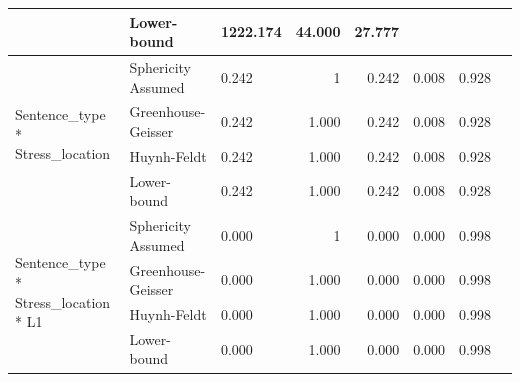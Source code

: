 \documentclass[a4paper]{article}
\begin{document}
\begin{table}[H]
\begin{center}
\begin{tabular}{p{}p{}|l|r|r|r|r|r|}
\cline{2-7}
                                                        & Lower-bound        & 1222.174                                     & 44.000                  & 27.777                           & \multicolumn{1}{l|}{~} & \multicolumn{1}{l|}{~}     \\ 
\hline
\multirow{4}{*}{Sentence\_type * Stress\_location}      & Sphericity Assumed & 0.242                                        & 1                       & 0.242                            & 0.008                  & 0.928                      \\ 
\cline{2-7}
                                                        & Greenhouse-Geisser & 0.242                                        & 1.000                   & 0.242                            & 0.008                  & 0.928                      \\ 
\cline{2-7}
                                                        & Huynh-Feldt        & 0.242                                        & 1.000                   & 0.242                            & 0.008                  & 0.928                      \\ 
\cline{2-7}
                                                        & Lower-bound        & 0.242                                        & 1.000                   & 0.242                            & 0.008                  & 0.928                      \\ 
\hline
\multirow{4}{*}{Sentence\_type * Stress\_location * L1} & Sphericity Assumed & 0.000                                        & 1                       & 0.000                            & 0.000                  & 0.998                      \\ 
\cline{2-7}
                                                        & Greenhouse-Geisser & 0.000                                        & 1.000                   & 0.000                            & 0.000                  & 0.998                      \\ 
\cline{2-7}
                                                        & Huynh-Feldt        & 0.000                                        & 1.000                   & 0.000                            & 0.000                  & 0.998                      \\ 
\cline{2-7}
                                                        & Lower-bound        & 0.000                                        & 1.000                   & 0.000                            & 0.000                  & 0.998                      \\ 

\end{tabular}
\end{center}
\end{table}
\end{document}
